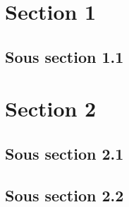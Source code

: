 \section{Section 1}
\lipsum[1-2]

\subsection{Sous section 1.1}
\lipsum[1-2]

\section{Section 2}
\lipsum[1-2][1-3]

\subsection{Sous section 2.1}
\lipsum[1-2][4-6]

\subsection{Sous section 2.2}
\lipsum[1-2]
